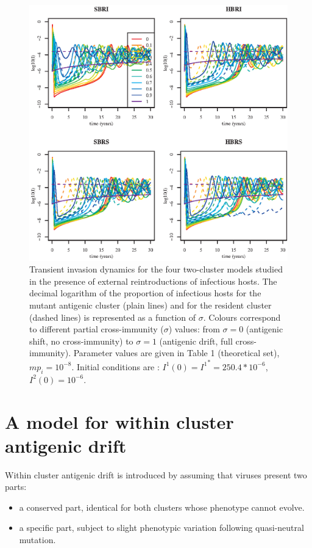 \begin{figure}[!h]
  \center
	\includegraphics[]{graphs/article1/traj_sir_theoretical_migr8.eps}
	\caption{Transient invasion dynamics for the four two-cluster
          models studied in the presence of external reintroductions
          of infectious hosts. The decimal logarithm of the proportion
          of infectious hosts for the mutant antigenic cluster (plain
          lines) and for the resident cluster (dashed lines) is
          represented as a function of $\sigma$. Colours correspond to
          different partial cross-immunity ($\sigma$) values: from
          $\sigma=0$ (antigenic shift, no cross-immunity) to
          $\sigma=1$ (antigenic drift, full cross-immunity). Parameter
          values are given in Table 1 (theoretical set),
          $mp_i=10^{-8}$. Initial conditions are : ${I^1}(0) =
          {I^1}^*=250.4*10^{-6}$, ${I^2}(0)=10^{-6}$.}
	\label{fig:deter_migr}
\end{figure}

\clearpage


\section{A model for within cluster antigenic drift}

Within cluster antigenic drift is introduced by assuming that viruses
present two parts:
\begin{itemize}
\item a conserved part, identical for both clusters whose phenotype
  cannot evolve.
\item a specific part, subject to slight phenotypic variation
  following quasi-neutral mutation.
\end{itemize}

